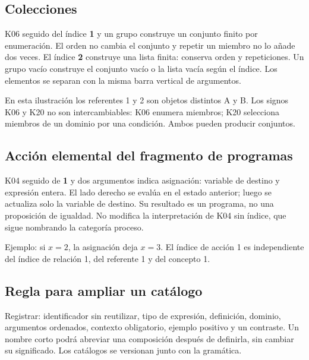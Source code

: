 \subsection{Colecciones}
K06 seguido del índice \textbf{1} y un grupo construye un conjunto finito por
enumeración. El orden no cambia el conjunto y repetir un miembro no lo añade dos
veces. El índice \textbf{2} construye una lista finita: conserva orden y repeticiones.
Un grupo vacío construye el conjunto vacío o la lista vacía según el índice.
Los elementos se separan con la misma barra vertical de argumentos.

En esta ilustración los referentes 1 y 2 son objetos distintos A y B.
Los signos K06 y K20 no son intercambiables: K06 enumera miembros; K20 selecciona
miembros de un dominio por una condición. Ambos pueden producir conjuntos.

\subsection{Acción elemental del fragmento de programas}
K04 seguido de \textbf{1} y dos argumentos indica asignación:
variable de destino y expresión entera. El lado derecho se evalúa en el estado
anterior; luego se actualiza solo la variable de destino. Su resultado es un
programa, no una proposición de igualdad. No modifica la interpretación de K04
sin índice, que sigue nombrando la categoría proceso.

Ejemplo: si \(x=2\), la asignación deja \(x=3\). El índice de acción 1 es
independiente del índice de relación 1, del referente 1 y del concepto 1.

\subsection{Regla para ampliar un catálogo}
Registrar: identificador sin reutilizar, tipo de expresión, definición, dominio,
argumentos ordenados, contexto obligatorio, ejemplo positivo y un contraste.
Un nombre corto podrá abreviar una composición después de definirla, sin cambiar
su significado. Los catálogos se versionan junto con la gramática.
